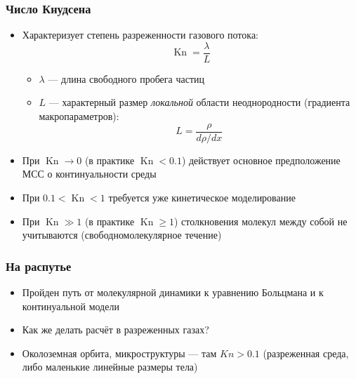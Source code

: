 \documentclass[onlymath]{beamer}
\DeclareMathOperator\Kn{Kn}
\begin{document}
\begin{frame}
  \frametitle{Число Кнудсена}

  \begin{itemize}
  \item Характеризует степень разреженности газового потока:
    \begin{equation*}
      \Kn = \frac{\lambda}{L}
    \end{equation*}
    \begin{itemize}
    \item $\lambda$ — длина свободного пробега частиц
    \item $L$ — характерный размер \emph{локальной} области
      неоднородности (градиента макропараметров):
      \begin{equation*}
        L = \frac{\rho}{d\rho / dx}
      \end{equation*}
    \end{itemize}

  \item При $\Kn \to 0$ (в практике $\Kn < 0.1$) действует основное
    предположение МСС о континуальности среды
  \item При $0.1 < \Kn < 1$ требуется уже кинетическое моделирование
  \item При $\Kn \gg 1$ (в практике $\Kn \geq 1$) столкновения молекул
    между собой не учитываются (свободномолекулярное течение)
  \end{itemize}
\end{frame}

\begin{frame}
  \frametitle{На распутье}
  \begin{itemize}
  \item Пройден путь от молекулярной динамики к уравнению Больцмана и
    к континуальной модели
  \item Как же делать расчёт в разреженных газах?
  \item Околоземная орбита, микроструктуры — там $Kn > 0.1$
    (разреженная среда, либо маленькие линейные размеры тела)
  \end{itemize}
\end{frame}
\end{document}
